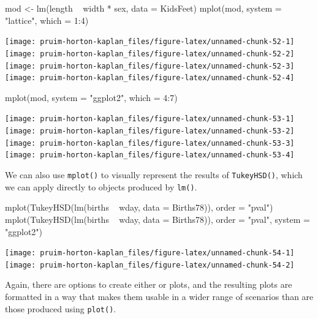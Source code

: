 \begin{Schunk}
\begin{Sinput}
mod <- lm(length ~ width * sex, data = KidsFeet)
mplot(mod, system = "lattice", which = 1:4)
\end{Sinput}


\begin{center}\texttt{[image: pruim-horton-kaplan\_files/figure-latex/unnamed-chunk-52-1]} \texttt{[image: pruim-horton-kaplan\_files/figure-latex/unnamed-chunk-52-2]} \texttt{[image: pruim-horton-kaplan\_files/figure-latex/unnamed-chunk-52-3]} \texttt{[image: pruim-horton-kaplan\_files/figure-latex/unnamed-chunk-52-4]} \end{center}

\end{Schunk}\begin{Schunk}
\begin{Sinput}
mplot(mod, system = "ggplot2", which = 4:7)
\end{Sinput}


\begin{center}\texttt{[image: pruim-horton-kaplan\_files/figure-latex/unnamed-chunk-53-1]} \texttt{[image: pruim-horton-kaplan\_files/figure-latex/unnamed-chunk-53-2]} \texttt{[image: pruim-horton-kaplan\_files/figure-latex/unnamed-chunk-53-3]} \texttt{[image: pruim-horton-kaplan\_files/figure-latex/unnamed-chunk-53-4]} \end{center}

\end{Schunk}

We can also use \texttt{mplot()} to visually represent the results of
\texttt{TukeyHSD()}, which we can apply directly to objects produced by
\texttt{lm()}.

\begin{Schunk}
\begin{Sinput}
mplot(TukeyHSD(lm(births ~ wday, data = Births78)), order = "pval")
mplot(TukeyHSD(lm(births ~ wday, data = Births78)), order = "pval", system = "ggplot2") 
\end{Sinput}


\begin{center}\texttt{[image: pruim-horton-kaplan\_files/figure-latex/unnamed-chunk-54-1]} \texttt{[image: pruim-horton-kaplan\_files/figure-latex/unnamed-chunk-54-2]} \end{center}

\end{Schunk}

\noindent
Again, there are options to create either  or 
plots, and the resulting plots are formatted in a way that makes them
usable in a wider range of scenarios than are those produced using
\texttt{plot()}.

